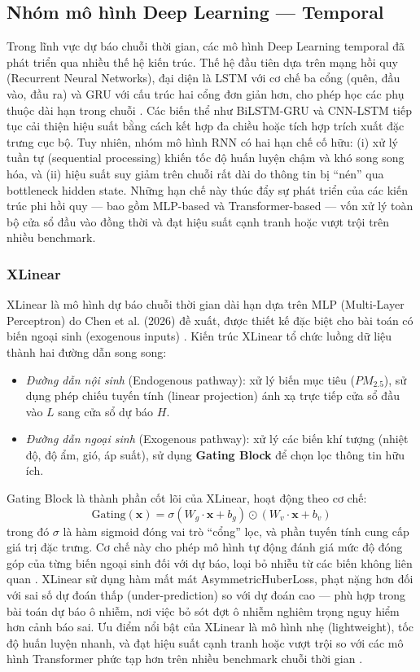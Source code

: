 \subsection{Nhóm mô hình Deep Learning — Temporal}
Trong lĩnh vực dự báo chuỗi thời gian, các mô hình Deep Learning temporal đã phát triển qua nhiều thế hệ kiến trúc. Thế hệ đầu tiên dựa trên mạng hồi quy (Recurrent Neural Networks), đại diện là LSTM với cơ chế ba cổng (quên, đầu vào, đầu ra) và GRU với cấu trúc hai cổng đơn giản hơn, cho phép học các phụ thuộc dài hạn trong chuỗi \cite{silveira2025lstmgru}. Các biến thể như BiLSTM-GRU \cite{he2024bilstmgru} và CNN-LSTM \cite{zhang2025cnnlstm} tiếp tục cải thiện hiệu suất bằng cách kết hợp đa chiều hoặc tích hợp trích xuất đặc trưng cục bộ. Tuy nhiên, nhóm mô hình RNN có hai hạn chế cố hữu: (i) xử lý tuần tự (sequential processing) khiến tốc độ huấn luyện chậm và khó song song hóa, và (ii) hiệu suất suy giảm trên chuỗi rất dài do thông tin bị ``nén'' qua bottleneck hidden state. Những hạn chế này thúc đẩy sự phát triển của các kiến trúc phi hồi quy — bao gồm MLP-based và Transformer-based — vốn xử lý toàn bộ cửa sổ đầu vào đồng thời và đạt hiệu suất cạnh tranh hoặc vượt trội trên nhiều benchmark.
\subsubsection{XLinear}
XLinear là mô hình dự báo chuỗi thời gian dài hạn dựa trên MLP (Multi-Layer Perceptron) do Chen et al. (2026) đề xuất, được thiết kế đặc biệt cho bài toán có biến ngoại sinh (exogenous inputs) \cite{Chen_2026}. Kiến trúc XLinear tổ chức luồng dữ liệu thành hai đường dẫn song song:
\begin{itemize}
    \item \textit{Đường dẫn nội sinh} (Endogenous pathway): xử lý biến mục tiêu ($PM_{2.5}$), sử dụng phép chiếu tuyến tính (linear projection) ánh xạ trực tiếp cửa sổ đầu vào $L$ sang cửa sổ dự báo $H$.
    \item \textit{Đường dẫn ngoại sinh} (Exogenous pathway): xử lý các biến khí tượng (nhiệt độ, độ ẩm, gió, áp suất), sử dụng \textbf{Gating Block} để chọn lọc thông tin hữu ích.
\end{itemize}
Gating Block là thành phần cốt lõi của XLinear, hoạt động theo cơ chế:
\begin{equation}
    \text{Gating}(\mathbf{x}) = \sigma(W_g \cdot \mathbf{x} + b_g) \odot (W_v \cdot \mathbf{x} + b_v)
\end{equation}
trong đó $\sigma$ là hàm sigmoid đóng vai trò ``cổng'' lọc, và phần tuyến tính cung cấp giá trị đặc trưng. Cơ chế này cho phép mô hình tự động đánh giá mức độ đóng góp của từng biến ngoại sinh đối với dự báo, loại bỏ nhiễu từ các biến không liên quan \cite{Chen_2026}. XLinear sử dụng hàm mất mát AsymmetricHuberLoss, phạt nặng hơn đối với sai số dự đoán thấp (under-prediction) so với dự đoán cao — phù hợp trong bài toán dự báo ô nhiễm, nơi việc bỏ sót đợt ô nhiễm nghiêm trọng nguy hiểm hơn cảnh báo sai. Ưu điểm nổi bật của XLinear là mô hình nhẹ (lightweight), tốc độ huấn luyện nhanh, và đạt hiệu suất cạnh tranh hoặc vượt trội so với các mô hình Transformer phức tạp hơn trên nhiều benchmark chuỗi thời gian \cite{Chen_2026}.

